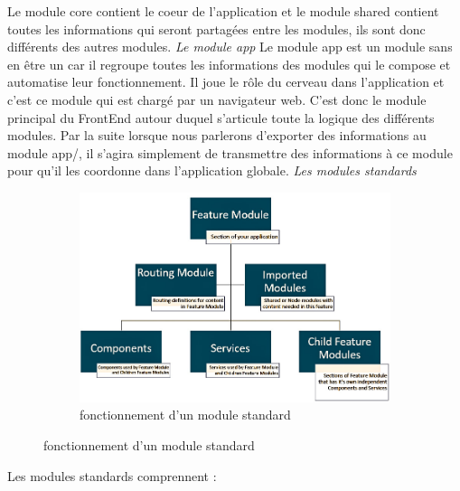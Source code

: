 \documentclass{article}
\begin{document}
Le module core contient le coeur de l'application et le module shared contient toutes les informations qui seront partagées entre les modules, ils sont donc différents des autres modules.
\newpage
\textit{Le module app}
\newline
\newline
Le module app est un module sans en être un car il regroupe toutes les informations des modules qui le compose et automatise leur fonctionnement.
Il joue le rôle du cerveau dans l'application et c'est ce module qui est chargé par un navigateur web. C'est donc le module principal du FrontEnd autour duquel s'articule toute la logique des différents modules.
Par la suite lorsque nous parlerons d'exporter des informations au module app/, il s'agira simplement de transmettre des informations à ce module pour qu'il les coordonne dans l'application globale.
\newline
\newline
\textit{Les modules standards}
\newline
\begin{figure}[h!]
	\centering
  	\begin{subfigure}[b]{1.0\linewidth}
	\includegraphics[width=\linewidth]{ang.jpeg}
	\caption{fonctionnement d'un module standard}
  	\end{subfigure}
\end{figure}
\newline
Les modules standards comprennent :
\end{document}
